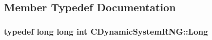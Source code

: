 \subsection{Member Typedef Documentation}
\hypertarget{class_c_dynamic_system_r_n_g_ab5df6da5f9eaeb3d9cddc97405a09995}{
\subsubsection[{Long}]{\setlength{\rightskip}{0pt plus 5cm}typedef long long int {\bf C\-Dynamic\-System\-R\-N\-G\-::\-Long}\hspace{0.3cm}{\ttfamily [private]}}}\label{class_c_dynamic_system_r_n_g_ab5df6da5f9eaeb3d9cddc97405a09995}


